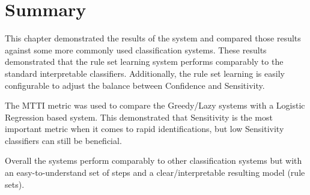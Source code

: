 \section{Summary}

This chapter demonstrated the results of the \Abb system and compared those results against some more commonly used classification systems. These results demonstrated that the \Abb rule set learning system performs comparably to the standard interpretable classifiers. Additionally, the \Abb rule set learning is easily configurable to adjust the balance between Confidence and Sensitivity.

The MTTI metric was used to compare the Greedy/Lazy \Abb systems with a Logistic Regression based \Abb system. This demonstrated that Sensitivity is the most important metric when it comes to rapid identifications, but low Sensitivity classifiers can still be beneficial.

Overall the \Abb systems perform comparably to other classification systems but with an easy-to-understand set of steps and a clear/interpretable resulting model (rule sets). 